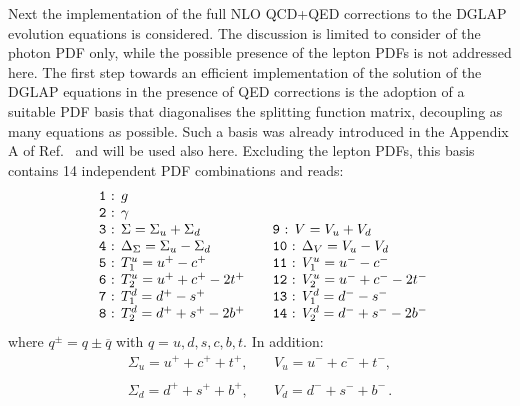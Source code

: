 Next the implementation of the full NLO QCD+QED corrections to the
DGLAP evolution equations is considered. The discussion is limited to
consider of the photon PDF only, while the possible presence of the
lepton PDFs is not addressed here. The first step towards an efficient
implementation of the solution of the DGLAP equations in the presence
of QED corrections is the adoption of a suitable PDF basis that
diagonalises the splitting function matrix, decoupling as many
equations as possible. Such a basis was already introduced in the
Appendix A of Ref.~\cite{Bertone:2015lqa} and will be used also here.
Excluding the lepton PDFs, this basis contains 14 independent PDF
combinations and reads:
\begin{equation}\label{eq:EvolBasis}
\begin{array}{ll}
\mbox{\texttt{ 1} : }g & \\
\mbox{\texttt{ 2} : }\gamma & \\
\mbox{\texttt{ 3} : }\displaystyle \Sigma = \Sigma_u + \Sigma_d & \quad
\mbox{\texttt{9} : }\displaystyle V =V_u +  V_d\\
\mbox{\texttt{ 4} : } \displaystyle \Delta_\Sigma = \Sigma_u - \Sigma_d& \quad\displaystyle 
\mbox{\texttt{10} : } \Delta_V = V_u - V_d\\
\mbox{\texttt{ 5} : }T_1^u = u^+ - c^+ &\quad \mbox{\texttt{11} : }V_1^u = u^- - c^- \\
\mbox{\texttt{ 6} : }T_2^u = u^+ + c^+ - 2t^+ &\quad \mbox{\texttt{12} : }V_2^u = u^- + c^- - 2t^-\\
\mbox{\texttt{ 7} : }T_1^d = d^+ - s^+ &\quad \mbox{\texttt{13} : }V_1^d = d^- - s^- \\
\mbox{\texttt{ 8} : }T_2^d = d^+ + s^+ - 2b^+ &\quad \mbox{\texttt{14}
                                               : }V_2^d = d^- + s^- -
                                               2b^-\\
\end{array}
\end{equation}
where $q^\pm = q\pm\overline{q}$ with $q = u,d,s,c,b,t$. In addition:
\begin{equation}
\begin{array}{ll}
\Sigma_u = u^++c^++t^+, &\quad V_u = u^-+c^-+t^-,\\
\\
\Sigma_d = d^++s^++b^+,&\quad V_d = d^-+s^-+b^-\,.
\end{array}
\end{equation}

